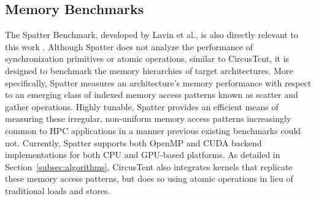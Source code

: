 \subsection{Memory Benchmarks}
\label{subsec:memory_bench}

The Spatter Benchmark, developed by Lavin et al., is also directly relevant to this work \cite{lavin2018spatter}.
Although Spatter does not analyze the performance of synchronization primitives or atomic operations, similar to CircusTent, it is designed to benchmark the memory hierarchies of target architectures.
More specifically, Spatter measures an architecture's memory performance with respect to an emerging class of indexed memory access patterns known as scatter and gather operations.
Highly tunable, Spatter provides an efficient means of measuring these irregular, non-uniform memory access patterns increasingly common to HPC applications in a manner previous existing benchmarks could not.
Currently, Spatter supports both OpenMP and CUDA backend implementations for both CPU and GPU-based platforms.
As detailed in Section~\ref{subsec:algorithms}, CircusTent also integrates kernels that replicate these memory access patterns, but does so using atomic operations in lieu of traditional loads and stores.
